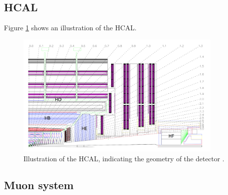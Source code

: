 \subsection{HCAL}
\label{sec:CMSLHC_CMS_hcal}
Figure \ref{fig:CMS_HCAL} shows an illustration of the \ac{HCAL}.

\begin{figure}[h!]
\begin{center}
\includegraphics[width=0.9\textwidth]{./Detector/Plots/HCAL.png}
\caption{Illustration of the \ac{HCAL}, indicating the geometry
of the detector \cite{cms-jinst}.}
\label{fig:CMS_HCAL}
\end{center}
\end{figure}

\subsection{Muon system}
\label{sec:CMSLHC_CMS_muons}

